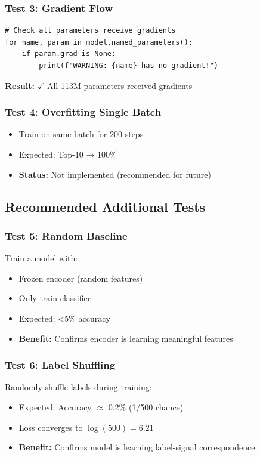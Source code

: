 \documentclass[12pt,a4paper]{article}
\begin{document}
\subsubsection{Test 3: Gradient Flow}
\begin{lstlisting}[caption=Gradient Check]
# Check all parameters receive gradients
for name, param in model.named_parameters():
    if param.grad is None:
        print(f"WARNING: {name} has no gradient!")
\end{lstlisting}

\textbf{Result:} $\checkmark$ All 113M parameters received gradients

\subsubsection{Test 4: Overfitting Single Batch}
\begin{itemize}
    \item Train on same batch for 200 steps
    \item Expected: Top-10 → 100\%
    \item \textbf{Status:} Not implemented (recommended for future)
\end{itemize}

\subsection{Recommended Additional Tests}

\subsubsection{Test 5: Random Baseline}
Train a model with:
\begin{itemize}
    \item Frozen encoder (random features)
    \item Only train classifier
    \item Expected: <5\% accuracy
    \item \textbf{Benefit:} Confirms encoder is learning meaningful features
\end{itemize}

\subsubsection{Test 6: Label Shuffling}
Randomly shuffle labels during training:
\begin{itemize}
    \item Expected: Accuracy $\approx$ 0.2\% (1/500 chance)
    \item Loss converges to $\log(500) = 6.21$
    \item \textbf{Benefit:} Confirms model is learning label-signal correspondence
\end{itemize}
\end{document}
